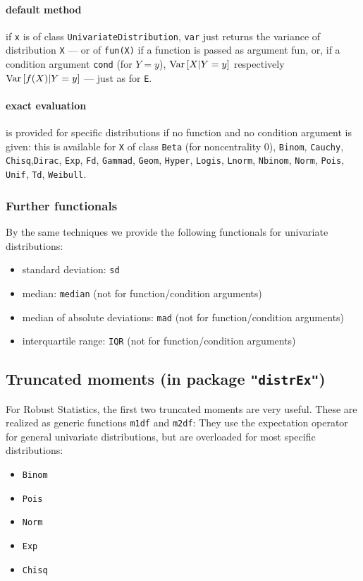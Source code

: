 \documentclass[11pt]{article}
\newcommand{\code}[1]{{\tt #1}}
\newcommand{\pkg}[1]{{\tt "#1"}}
\begin{document}
\paragraph{default method} if \code{x} is of class \code{UnivariateDistribution}, \code{var}
just returns the variance of distribution \code{X} --- or of \code{fun(X)} if a function
is passed as argument fun, or, if a condition argument \code{cond} (for $Y=y$),  ${\rm Var}\,[X|Y=y]$ respectively ${\rm Var}\,[f(X)|Y=y]$
--- just as for \code{E}.
\paragraph{exact evaluation} is provided for specific distributions if no function and no condition argument is given:
this is available for \code{X} of class \code{Beta} (for noncentrality $0$), \code{Binom}, \code{Cauchy}, \code{Chisq},\code{Dirac}, \code{Exp}, \code{Fd}, \code{Gammad},
\code{Geom}, \code{Hyper}, \code{Logis}, \code{Lnorm}, \code{Nbinom}, \code{Norm}, \code{Pois}, \code{Unif}, \code{Td}, \code{Weibull}.
\subsubsection{Further functionals}
By the same techniques we provide the following functionals for univariate distributions:
\begin{itemize}
  \item standard deviation: \code{sd}
  \item median: \code{median} (not for function/condition arguments)
  \item median of absolute deviations: \code{mad} (not for function/condition arguments)
  \item interquartile range: \code{IQR} (not for function/condition arguments)
\end{itemize}
%
\subsection[Truncated moments (in package distrEx)]{Truncated moments (in package \pkg{distrEx})}\label{m1df}
%
For Robust Statistics, the first two truncated moments are very useful. These are realized as generic functions \code{m1df} and \code{m2df}:
They use the expectation operator for general univariate distributions, but are overloaded for most specific distributions:
\begin{itemize}
  \item \code{Binom}
  \item \code{Pois}
  \item \code{Norm}
  \item \code{Exp}
  \item \code{Chisq}
\end{itemize}
%
\end{document}
